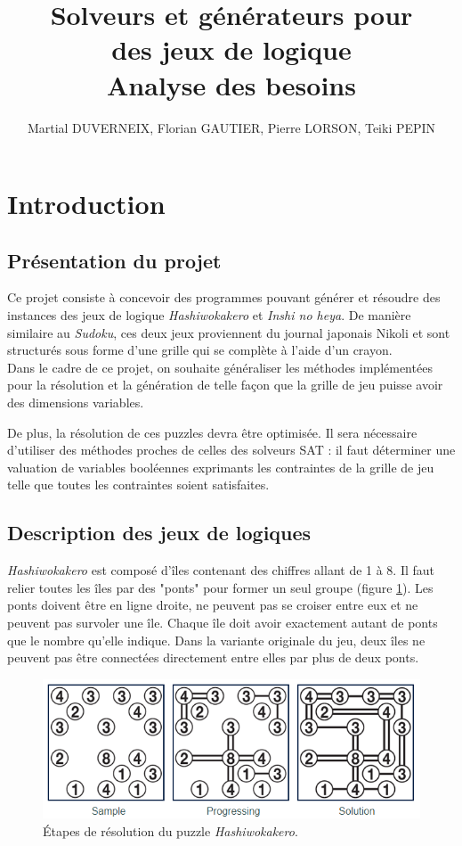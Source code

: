 \documentclass[12pt]{article}
\title {Solveurs et générateurs pour
	\\ des jeux de logique
	\\ \large Analyse des besoins}
\author{Martial DUVERNEIX, Florian GAUTIER, Pierre LORSON, Teiki PEPIN}
\begin{document}
\maketitle
\newpage

\tableofcontents
\newpage

\section{Introduction}

\subsection{Présentation du projet}

Ce projet consiste à concevoir des programmes pouvant générer et résoudre des instances des jeux de logique \textit{Hashiwokakero} et \textit{Inshi no heya}. De manière similaire au \textit{Sudoku}, ces deux jeux proviennent du journal japonais Nikoli et sont structurés sous forme d'une grille qui se complète à l'aide d'un crayon.\\

Dans le cadre de ce projet, on souhaite généraliser les méthodes implémentées pour la résolution et la génération de telle façon que la grille de jeu puisse avoir des dimensions variables. 

De plus, la résolution de ces puzzles devra être optimisée. Il sera nécessaire d'utiliser des méthodes proches de celles des solveurs SAT : il faut déterminer une valuation de variables booléennes exprimants les contraintes de la grille de jeu telle que toutes les contraintes soient satisfaites.\\

\subsection{Description des jeux de logiques}

\textit{Hashiwokakero} \cite{NikHashi18} est composé d'îles contenant des chiffres allant de 1 à 8. Il faut relier toutes les îles par des "ponts" pour former un seul groupe (figure \ref{fig:hashiwokakero}). Les ponts doivent être en ligne droite, ne peuvent pas se croiser entre eux et ne peuvent pas survoler une île. Chaque île doit avoir exactement autant de ponts que le nombre qu'elle indique. Dans la variante originale du jeu, deux îles ne peuvent pas être connectées directement entre elles par plus de deux ponts.

\begin{figure}[H]
\caption{Étapes de résolution du puzzle \textit{Hashiwokakero}.}
\label{fig:hashiwokakero}
\centering
\includegraphics[width=.85\textwidth]{hashiwokakero}
\end{figure}
\end{document}
